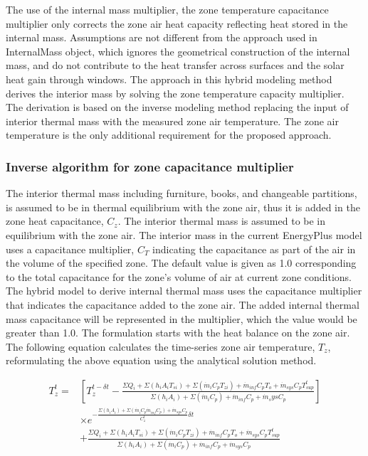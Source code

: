 The use of the internal mass multiplier, the zone temperature capacitance multiplier only corrects the zone air heat capacity reflecting heat stored in the internal mass. Assumptions are not different from the approach used in InternalMass object, which ignores the geometrical construction of the internal mass, and do not contribute to the heat transfer across surfaces and the solar heat gain through windows.  The approach in this hybrid modeling method derives the interior mass by solving the zone temperature capacity multiplier. The derivation is based on the inverse modeling method replacing the input of interior thermal mass with the measured zone air temperature. The zone air temperature is the only additional requirement for the proposed approach.


\subsubsection{Inverse algorithm for zone capacitance multiplier}\label{Inverse-algorithm-for-zone-capacitance-multiplier}

The interior thermal mass including furniture, books, and changeable partitions, is assumed to be in thermal equilibrium with the zone air, thus it is added in the zone heat capacitance, $C_z$.  The interior thermal mass is assumed to be in equilibrium with the zone air. The interior mass in the current EnergyPlus model uses a capacitance multiplier, $C_T$ indicating the capacitance as part of the air in the volume of the specified zone. The default value is given as 1.0 corresponding to the total capacitance for the zone's volume of air at current zone conditions. The hybrid model to derive internal thermal mass uses the capacitance multiplier that indicates the capacitance added to the zone air. The added internal thermal mass capacitance will be represented in the multiplier, which the value would be greater than 1.0. The formulation starts with the heat balance on the zone air. The following equation calculates the time-series zone air temperature, $T_z$, reformulating the above equation using the analytical solution method.

\begin{equation}
\begin{aligned}
T_z^t = &\left[T_z^{t-\delta t} - \frac {\Sigma Q_i + \Sigma (h_i A_i T_{si}) + \Sigma (\dot{m}_i C_p T_{zi}) +\dot{m}_{inf} C_p T_o + \dot{m}_{sys} C_pT_{sup}^t} {\Sigma (h_i A_i)  + \Sigma(\dot{m}_i C_p) + \dot{m}_{inf} C_p + \dot{m}_sys C_p}\right]\\ &\times e^{ - \frac {\Sigma (h_i A_i) + \Sigma (\dot{m}_i C_p \dot{m}_{inf} C_p)+ \dot{m}_{sys} C_p} {C_z^t } \delta t} \\ &+ \frac {\Sigma Q_i +\Sigma(h_i A_i T_{si}) + \Sigma(\dot{m}_i C_p T_{zi}) + \dot{m}_{inf} C_p T_o + \dot{m}_{sys} C_p T_{sup}^t} {\Sigma(h_i A_i) +\Sigma(\dot{m}_i C_p)  + \dot{m}_{inf} C_p + \dot{m}_{sys} C_p }
\end{aligned}
\end{equation}

